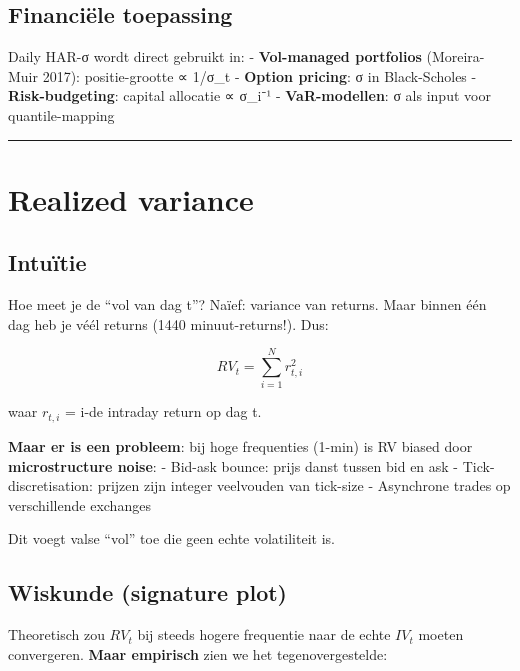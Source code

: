\documentclass[11pt,a4paper]{article}
\begin{document}
\hypertarget{financiuxeble-toepassing}{%
\subsection{Financiële toepassing}\label{financiuxeble-toepassing}}

Daily HAR-σ wordt direct gebruikt in:
- \textbf{Vol-managed portfolios} (Moreira-Muir 2017): positie-grootte ∝ 1/σ\_t
- \textbf{Option pricing}: σ in Black-Scholes
- \textbf{Risk-budgeting}: capital allocatie ∝ σ\_i⁻¹
- \textbf{VaR-modellen}: σ als input voor quantile-mapping

\begin{center}\rule{0.5\linewidth}{0.5pt}\end{center}

\hypertarget{realized-variance}{%
\section{Realized variance}\label{realized-variance}}

\hypertarget{intuuxeftie-1}{%
\subsection{Intuïtie}\label{intuuxeftie-1}}

Hoe meet je de ``vol van dag t''? Naïef: variance van returns. Maar binnen één dag heb je véél returns (1440 minuut-returns!). Dus:

\[RV_t = \sum_{i=1}^{N} r_{t,i}^2\]

waar \(r_{t,i}\) = i-de intraday return op dag t.

\textbf{Maar er is een probleem}: bij hoge frequenties (1-min) is RV biased door \textbf{microstructure noise}:
- Bid-ask bounce: prijs danst tussen bid en ask
- Tick-discretisation: prijzen zijn integer veelvouden van tick-size
- Asynchrone trades op verschillende exchanges

Dit voegt valse ``vol'' toe die geen echte volatiliteit is.

\hypertarget{wiskunde-signature-plot}{%
\subsection{Wiskunde (signature plot)}\label{wiskunde-signature-plot}}

Theoretisch zou \(RV_t\) bij steeds hogere frequentie naar de echte \(IV_t\) moeten convergeren. \textbf{Maar empirisch} zien we het tegenovergestelde:
\end{document}
